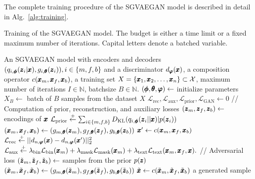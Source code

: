 The complete training procedure of the SGVAEGAN model is described in detail in Alg.~\ref{alg:training}.
\begin{algorithm}
\caption{Training of the SGVAEGAN model. The budget is either a time limit or a fixed maximum number of iterations. Capital letters denote a batched variable.}\label{alg:training}
\begin{algorithmic}[1]
\Require An SGVAEGAN model with encoders and decoders $\left( q_{i,\vc{\phi}}(\vc{z}_i|\vc{x}), g_{i,\vc{\theta}} (\vc{z}_i) \right), i \in \lbrace m,f,b \rbrace$ and a discriminator $d_{\pmb{{\varphi}}}(\pmb{{x}})$, a composition operator $c(\pmb{{x}}_m,\pmb{{x}}_f,\pmb{{x}}_b)$, a training set $X=\lbrace \pmb{{x}}_1, \pmb{{x}}_2, \ldots, \pmb{{x}}_n \rbrace \subset \mathcal{X}$, maximum number of iterations $I\in\mathbb{N}$, batchsize $B \in \mathbb{N}$.
\State $(\pmb{{\phi}}, \pmb{{\theta}}, \pmb{{\varphi}})  \leftarrow $ initialize parameters
    \State $X_B \leftarrow $ batch of $B$ samples from the dataset $X$
    \State $\mathcal{L}_{\text{rec}}, \mathcal{L}_{\text{aux}}, \mathcal{L}_{\text{prior}}, \mathcal{L}_{\text{GAN}} \leftarrow 0$
        \State // Computation of prior, reconstruction, and auxiliary losses
        \State $(\pmb{{z}}_m, \pmb{{z}}_f, \pmb{{z}}_b) \leftarrow $ encodings of $\pmb{{x}}$
        \State $\mathcal{L}_{\text{prior}} \stackrel{+}\leftarrow \sum_{i \in \lbrace m, f, b \rbrace} D_\text{KL} (q_{i,\pmb{{\phi}}} (\pmb{{z}}_i \vert \vert \pmb{{x}}) \vert p(\pmb{{z}}_i))$  
        \State $(\pmb{{x}}_m,\pmb{{x}}_f,\pmb{{x}}_b) \leftarrow (g_{m, \pmb{{\theta}}}(\pmb{{z}}_m), g_{f, \pmb{{\theta}}}(\pmb{{z}}_f), g_{b, \pmb{{\theta}}}(\pmb{{z}}_b))$ 
        \State $\pmb{{x}}' \leftarrow c(\pmb{{x}}_m,\pmb{{x}}_f,\pmb{{x}}_b)$
        \State $\mathcal{L}_{\text{rec}} \stackrel{+}\leftarrow \vert \vert d_{n,\pmb{{\varphi}}}(\pmb{{x}}) - d_{n,\pmb{{\varphi}}}(\pmb{{x}}') \vert \vert_2^2$
        \State $\mathcal{L}_{\text{aux}} \stackrel{+}\leftarrow \lambda_{\text{bin}}\mathcal{L}_{\text{bin}}(\pmb{{x}}_m) + \lambda_{\text{mask}}\mathcal{L}_{\text{mask}}(\pmb{{x}}_m) + \lambda_{\text{text}}\mathcal{L}_{\text{text}}(\pmb{{x}}_m,\pmb{{x}}_f,\pmb{{x}}).$
        \State // Adversarial loss 
        \State $(\tilde{\pmb{{z}}}_m, \tilde{\pmb{{z}}}_f, \tilde{\pmb{{z}}}_b) \leftarrow $ samples from the prior $p(\pmb{{z}})$
        \State $(\tilde{\pmb{{x}}}_m,\tilde{\pmb{{x}}}_f,\tilde{\pmb{{x}}}_b) \leftarrow (g_{m, \pmb{{\theta}}}(\tilde{\pmb{{z}}}_m), g_{f, \pmb{{\theta}}}(\tilde{\pmb{{z}}}_f), g_{b, \pmb{{\theta}}}(\tilde{\pmb{{z}}}_b))$ 
        \State $\tilde{\pmb{{x}}} \leftarrow c(\tilde{\pmb{{x}}}_m,\tilde{\pmb{{x}}}_f,\tilde{\pmb{{x}}}_b)$ a generated sample

\end{algorithmic}
\end{algorithm}
